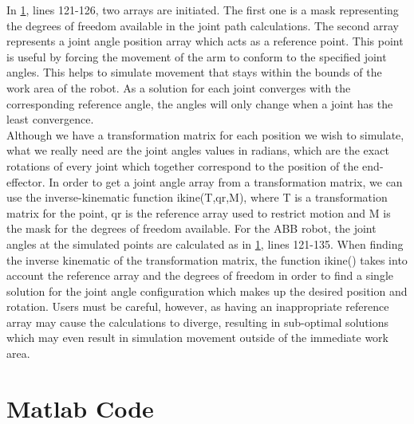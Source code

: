 \documentclass[11pt,a4paper]{report}
\begin{document}
In \cref{Matlab}, lines 121-126, two arrays are initiated. The first one is a mask representing the degrees of freedom available in the joint path calculations. The second array represents a joint angle position array which acts as a reference point. This point is useful by forcing the movement of the arm to conform to the specified joint angles. This helps to simulate movement that stays within the bounds of the work area of the robot. As a solution for each joint converges with the corresponding reference angle, the angles will only change when a joint has the least convergence.\\
Although we have a transformation matrix for each position we wish to simulate, what we really need are the joint angles values in radians, which are the exact rotations of every joint which together correspond to the position of the end-effector. In order to get a joint angle array from a transformation matrix, we can use the inverse-kinematic function ikine(T,qr,M), where T is a transformation matrix for the point, qr is the reference array used to restrict motion and M is the mask for the degrees of freedom available. For the ABB robot, the joint angles at the simulated points are calculated as in \cref{Matlab}, lines 121-135. When finding the inverse kinematic of the transformation matrix, the function ikine() takes into account the reference array and the degrees of freedom in order to find a single solution for the joint angle configuration which makes up the desired position and rotation. Users must be careful, however, as having an inappropriate reference array may cause the calculations to diverge, resulting in sub-optimal solutions which may even result in simulation movement outside of the immediate work area.\\ 
 

\appendix
\chapter{Matlab Code}
\label{Matlab}
\end{document}
